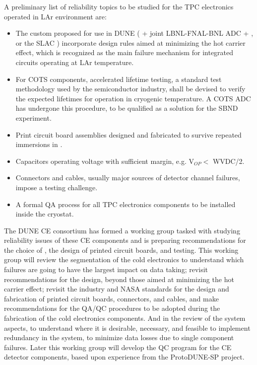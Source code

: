 A preliminary list of reliability topics to be studied for the TPC electronics operated in LAr environment are:
\begin{itemize}
	\item The custom  proposed for use in DUNE ( + joint LBNL-FNAL-BNL ADC +  , or the SLAC  ) incorporate design rules aimed at minimizing the hot carrier effect\cite{Li:2013ieee}\cite{Hoff:2015hax}, which is recognized as the main failure mechanism for integrated circuits operating at LAr temperature.
	\item For COTS components, accelerated lifetime testing, a standard test methodology used by the semiconductor industry, shall be devised to verify the expected lifetimes for operation in cryogenic temperature. A COTS ADC has undergone this procedure, to be qualified as a solution for the SBND experiment\cite{Chen:2018zic}.
	\item Print circuit board assemblies designed and fabricated to survive repeated immersions in \lntwo.
	\item Capacitors operating voltage with sufficient margin, e.g. V$_{OP}<$ WVDC/2.
	\item Connectors and cables, usually major sources of detector channel failures, impose a testing challenge.
	\item A formal QA process for all TPC electronics components to be installed inside the cryostat.
\end{itemize}
The DUNE CE consortium has formed a working group tasked with studying reliability issues of these CE components and is preparing recommendations for the choice of , the design of printed circuit boards, and testing. This working group will review the segmentation of the cold electronics to understand which failures are going to have the largest impact on data taking; revisit recommendations for the  design, beyond those aimed at minimizing the hot carrier effect; revisit the industry and NASA standards for the design and fabrication of printed circuit boards, connectors, and cables, and make recommendations for the QA/QC procedures to be adopted during the fabrication of the cold electronics components. And in the review of the system aspects, to understand where it is desirable, necessary, and feasible to implement redundancy in the system, to minimize data losses due to single component failures. Later this working group will develop the QC program for the CE detector components, based upon experience from the ProtoDUNE-SP project.

